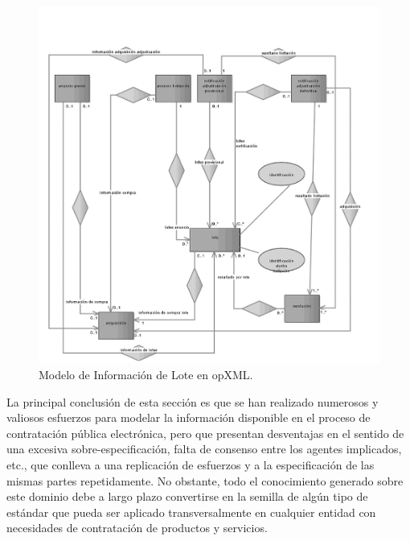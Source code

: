 \begin{figure}[!htb]
\centering
	\includegraphics[width=16cm]{images/phd/eproc/10ders-6}
\caption{Modelo de Información de Lote en opXML.}
\label{fig:10ders-6}
\end{figure}

La principal conclusión de esta sección es que se han realizado numerosos y valiosos esfuerzos
para modelar la información disponible en el proceso de contratación pública electrónica, pero
que presentan desventajas en el sentido de una excesiva sobre-especificación, falta de consenso
entre los agentes implicados, etc., que conlleva a una replicación de esfuerzos y a la especificación
de las mismas partes repetidamente. No obstante, todo el conocimiento generado sobre este dominio
debe a largo plazo convertirse en la semilla de algún tipo de estándar que pueda ser aplicado
transversalmente en cualquier entidad con necesidades de contratación de productos y servicios.

\cleardoublepage

